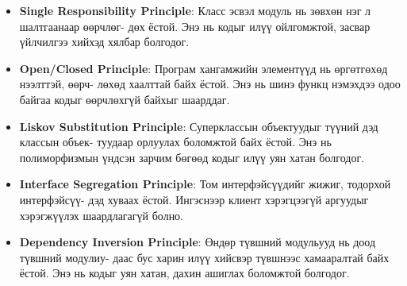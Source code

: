 \begin{itemize}
	\item \textbf{Single Responsibility Principle}: Класс эсвэл модуль нь зөвхөн нэг л шалтгаанаар өөрчлөг- дөх ёстой. Энэ нь кодыг илүү ойлгомжтой, засвар үйлчилгээ хийхэд хялбар болгодог.
	\item \textbf{Open/Closed Principle}: Програм хангамжийн элементүүд нь өргөтгөхөд нээлттэй, өөрч- лөхөд хаалттай байх ёстой. Энэ нь шинэ функц нэмэхдээ одоо байгаа кодыг өөрчлөхгүй байхыг шаарддаг.
	\item \textbf{Liskov Substitution Principle}: Суперклассын объектуудыг түүний дэд классын объек- туудаар орлуулах боломжтой байх ёстой. Энэ нь полиморфизмын үндсэн зарчим бөгөөд кодыг илүү уян хатан болгодог.
	\item \textbf{Interface Segregation Principle}: Том интерфэйсүүдийг жижиг, тодорхой интерфэйсүү- дэд хуваах ёстой. Ингэснээр клиент хэрэгцээгүй аргуудыг хэрэгжүүлэх шаардлагагүй болно.
	\item \textbf{Dependency Inversion Principle}: Өндөр түвшний модульууд нь доод түвшний модулиу- даас бус харин илүү хийсвэр түвшнээс хамааралтай байх ёстой. Энэ нь кодыг уян хатан, дахин ашиглах боломжтой болгодог.
\end{itemize}
